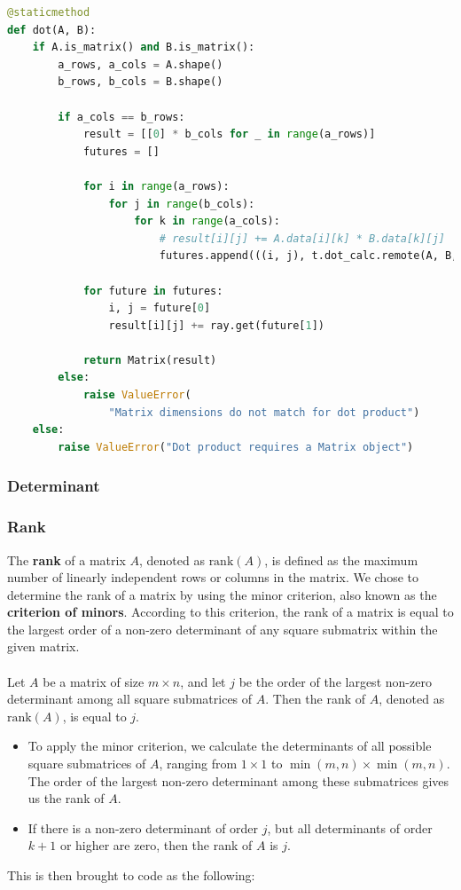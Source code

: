 \begin{lstlisting}[language=Python, caption={Parallelized dot function}]
@staticmethod
def dot(A, B):
    if A.is_matrix() and B.is_matrix():
        a_rows, a_cols = A.shape()
        b_rows, b_cols = B.shape()

        if a_cols == b_rows:
            result = [[0] * b_cols for _ in range(a_rows)]
            futures = []

            for i in range(a_rows):
                for j in range(b_cols):
                    for k in range(a_cols):
                        # result[i][j] += A.data[i][k] * B.data[k][j]
                        futures.append(((i, j), t.dot_calc.remote(A, B, i, j, k)))
            
            for future in futures:
                i, j = future[0]
                result[i][j] += ray.get(future[1])

            return Matrix(result)
        else:
            raise ValueError(
                "Matrix dimensions do not match for dot product")
    else:
        raise ValueError("Dot product requires a Matrix object")
\end{lstlisting}

\subsubsection{Determinant}

\pagebreak
\subsubsection{Rank}
The \textbf{rank} of a matrix $A$, denoted as $\text{rank}(A)$, is defined as the maximum number of linearly independent rows or columns in the matrix. We chose to determine the rank of a matrix by using the minor criterion, also known as the \textbf{criterion of minors}. According to this criterion, the rank of a matrix is equal to the largest order of a non-zero determinant of any square submatrix within the given matrix.
\\
\\
Let $A$ be a matrix of size $m \times n$, and let $j$ be the order of the largest non-zero determinant among all square submatrices of $A$. Then the rank of $A$, denoted as $\text{rank}(A)$, is equal to $j$.

\begin{itemize}
    \item{To apply the minor criterion, we calculate the determinants of all possible square submatrices of $A$, ranging from $1 \times 1$ to $\min(m,n) \times \min(m,n)$. The order of the largest non-zero determinant among these submatrices gives us the rank of $A$.}
    \item{If there is a non-zero determinant of order $j$, but all determinants of order $k+1$ or higher are zero, then the rank of $A$ is $j$.}
\end{itemize}
This is then brought to code as the following:

